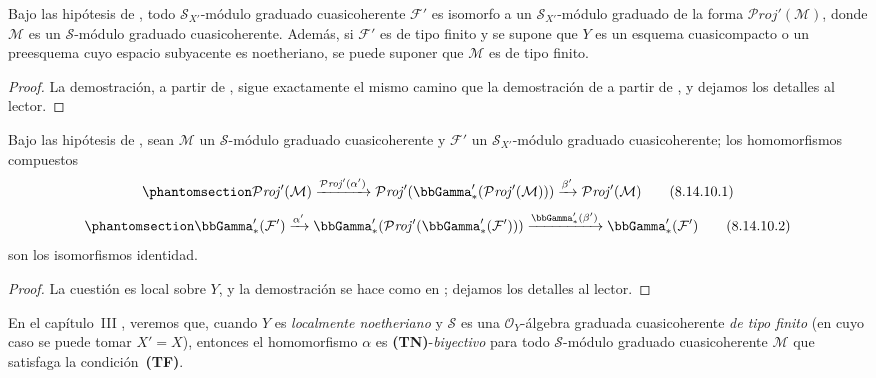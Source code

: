 \documentclass[oneside,10pt]{amsart}
\newcommand{\oldpage}[2][]{\marginnote{\normalfont\footnotesize\textbf{#1}~|~#2}\ignorespaces}
\let\EGAOriginalLabel\label
\renewcommand{\label}[1]{\phantomsection\EGAOriginalLabel{#1}}
\begin{document}
\begin{corollary}[8.14.9]
\label{II.8.14.9-fr}
Bajo las hipótesis de , todo $\mathcal{S}_{X'}$-módulo graduado cuasicoherente $\mathcal{F}'$ es isomorfo a un $\mathcal{S}_{X'}$-módulo graduado de la forma $\mathcal{P}\mathit{roj}'(\mathcal{M})$, donde $\mathcal{M}$ es un $\mathcal{S}$-módulo graduado cuasicoherente.
Además, si $\mathcal{F}'$ es de tipo finito y se supone que $Y$ es un esquema cuasicompacto o un preesquema cuyo espacio subyacente es noetheriano, se puede suponer que $\mathcal{M}$ es de tipo finito.
\end{corollary}

\begin{proof}
La demostración, a partir de , sigue exactamente el mismo camino que la demostración de  a partir de , y dejamos los detalles al lector.
\end{proof}

\begin{proposition}[8.14.10]
\label{II.8.14.10-fr}
Bajo las hipótesis de , sean $\mathcal{M}$ un $\mathcal{S}$-módulo graduado cuasicoherente y $\mathcal{F}'$ un $\mathcal{S}_{X'}$-módulo graduado cuasicoherente;
los homomorfismos compuestos
\begin{equation}
\label{II.8.14.10.1-fr}
  \mathcal{P}\mathit{roj}'(\mathcal{M})
  \xrightarrow{\mathcal{P}\mathit{roj}'(\alpha')}
  \mathcal{P}\mathit{roj}'(\bbGamma'_*(\mathcal{P}\mathit{roj}'(\mathcal{M})))
  \xrightarrow{\beta'}\mathcal{P}\mathit{roj}'(\mathcal{M})
\tag{8.14.10.1}
\end{equation}
\begin{equation}
\label{II.8.14.10.2-fr}
  \bbGamma'_*(\mathcal{F}')
  \xrightarrow{\alpha'}
  \bbGamma'_*(\mathcal{P}\mathit{roj}'(\bbGamma'_*(\mathcal{F}')))
  \xrightarrow{\bbGamma'_*(\beta')}\bbGamma'_*(\mathcal{F}')
\tag{8.14.10.2}
\end{equation}
son los isomorfismos identidad.
\end{proposition}

\begin{proof}
La cuestión es local sobre $Y$, y la demostración se hace como en ;
dejamos los detalles al lector.
\end{proof}

\begin{remark}[8.14.11]
\label{II.8.14.11-fr}
En el capítulo~III , veremos que, cuando $Y$ es \emph{localmente noetheriano} y $\mathcal{S}$ es una $\mathcal{O}_Y$-álgebra graduada cuasicoherente \emph{de tipo finito} (en cuyo caso
\oldpage[II]{201}
se puede tomar $X'=X$), entonces el homomorfismo $\alpha$  es \textbf{(TN)}-\emph{biyectivo} para todo $\mathcal{S}$-módulo graduado cuasicoherente $\mathcal{M}$ que satisfaga la condición~\textbf{(TF)}.
\end{remark}
\end{document}
